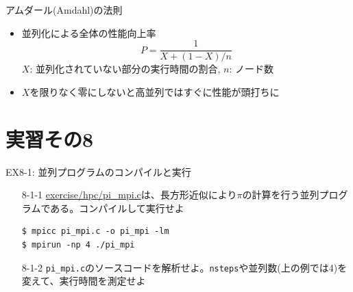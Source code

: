 \documentclass[dvipdfmx]{beamer}
\begin{document}
\begin{frame}[t,fragile]{アムダール(Amdahl)の法則}
  \begin{itemize}
    \setlength{\itemsep}{1em}
  \item 並列化による全体の性能向上率
    \[
    P = \frac{1}{X+(1-X)/n}
    \]
    $X$: 並列化されていない部分の実行時間の割合, $n$: ノード数
  \item $X$を限りなく零にしないと高並列ではすぐに性能が頭打ちに
  \end{itemize}
  \vspace*{-0em}\hspace*{1em}
\end{frame}

\section{実習その8}

\begin{frame}[t,fragile]{EX8-1: 並列プログラムのコンパイルと実行}
  \begin{itemize}
  \item[8-1-1] \href{https://github.com/todo-group/computer-experiments/exercise/hpc/pi_mpi.c}{exercise/hpc/pi\_mpi.c}は、長方形近似により$\pi$の計算を行う並列プログラムである。コンパイルして実行せよ
\begin{lstlisting}
$ mpicc pi_mpi.c -o pi_mpi -lm
$ mpirun -np 4 ./pi_mpi
\end{lstlisting}
  \item[8-1-2] {\tt pi\_mpi.c}のソースコードを解析せよ。{\tt nsteps}や並列数(上の例では4)を変えて、実行時間を測定せよ
  \end{itemize}
\end{frame}
\end{document}
